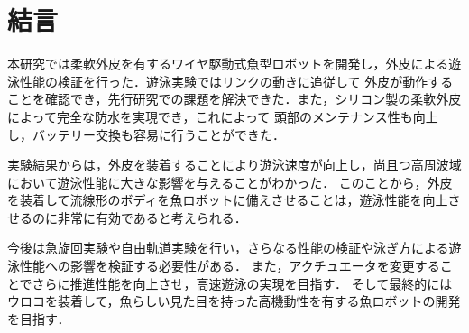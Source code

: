 \newpage
\section{結言}
本研究では柔軟外皮を有するワイヤ駆動式魚型ロボットを開発し，外皮による遊泳性能の検証を行った．遊泳実験ではリンクの動きに追従して
外皮が動作することを確認でき，先行研究\cite{kyu}での課題を解決できた．また，シリコン製の柔軟外皮によって完全な防水を実現でき，これによって
頭部のメンテナンス性も向上し，バッテリー交換も容易に行うことができた．

実験結果からは，外皮を装着することにより遊泳速度が向上し，尚且つ高周波域において遊泳性能に大きな影響を与えることがわかった．
このことから，外皮を装着して流線形のボディを魚ロボットに備えさせることは，遊泳性能を向上させるのに非常に有効であると考えられる．

今後は急旋回実験や自由軌道実験を行い，さらなる性能の検証や泳ぎ方による遊泳性能への影響を検証する必要性がある．
また，アクチュエータを変更することでさらに推進性能を向上させ，高速遊泳の実現を目指す．
そして最終的にはウロコを装着して，魚らしい見た目を持った高機動性を有する魚ロボットの開発を目指す．
